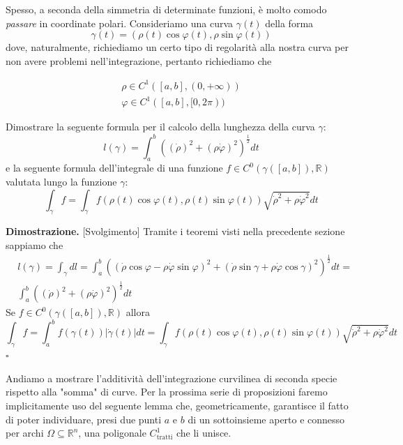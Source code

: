 \vspace{0.5cm}
\begin{exercise}
Spesso, a seconda della simmetria di determinate funzioni, è molto comodo \emph{passare} in coordinate polari. Consideriamo una curva $\gamma(t)$ della forma
$$
\gamma(t) = (\rho (t) \cos{\varphi(t)}, \rho \sin{\varphi(t)})
$$ 
dove, naturalmente, richiediamo un certo tipo di regolarità alla nostra curva per non avere problemi nell'integrazione, pertanto richiediamo che

\begin{align*}
	\rho \in C^1([a, b], (0, +\infty)) \\
	\varphi \in C^1([a, b], [0, 2\pi))
\end{align*}

Dimostrare la seguente formula per il calcolo della lunghezza della curva $\gamma$:
$$
l(\gamma) = \int_a^b ((\dot{\rho})^2 + (\rho \dot{\varphi})^2)^{\frac{1}{2}} dt
$$
e la seguente formula dell'integrale di una funzione $f \in C^0(\gamma([a, b]), \mathbb{R})$ valutata lungo la funzione $\gamma$:
$$
\int_\gamma f = \int_\gamma f(\rho(t) \cos{\varphi(t)}, \rho(t) \sin{\varphi(t)}) \sqrt{\dot{\rho}^2 + \rho \dot{\varphi}^2} dt
$$
\end{exercise}

\noindent \textbf{Dimostrazione. } [Svolgimento]
Tramite i teoremi visti nella precedente sezione sappiamo che
\begin{align*}
&l(\gamma) = \int_\gamma dl = \int_a^b ( (\dot{\rho} \cos{\varphi} - \rho \dot{\varphi} \sin{\varphi})^ 2 + (\dot{\rho} \sin{\gamma} + \rho \dot{\varphi} \cos{\gamma})^2)^{\frac{1}{2}} dt = \\
&\int_a^b ((\dot{\rho})^2 + (\rho \dot{\varphi})^2)^{\frac{1}{2}}dt
\end{align*}
Se $f \in C^0(\gamma([a, b]), \mathbb{R})$ allora
$$
\int_\gamma f = \int_a^b f(\gamma(t))|\dot{\gamma}(t)|dt = \int_\gamma f(\rho(t) \cos{\varphi(t)}, \rho(t) \sin{\varphi(t)}) \sqrt{\dot{\rho}^2 + \rho \dot{\varphi}^2} dt
$$
\hfill $\square$

\vspace{0.5cm}
Andiamo a mostrare l'additività dell'integrazione curvilinea di seconda specie rispetto alla "somma" di curve.
Per la prossima serie di proposizioni faremo implicitamente uso del seguente lemma che, geometricamente, garantisce il fatto di poter individuare, presi due punti $a$ e $b$ di un sottoinsieme aperto e connesso per archi $\Omega \subseteq \mathbb{R}^n$, una poligonale $C^1_\text{tratti}$ che li unisce.

